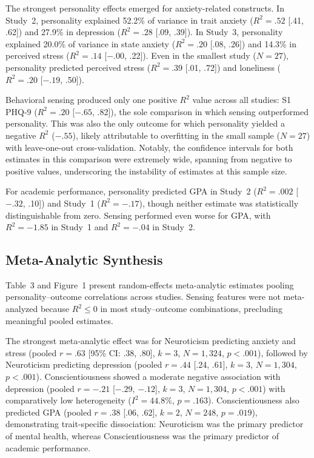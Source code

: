 \documentclass[12pt, a4paper]{article}
\begin{document}
The strongest personality effects emerged for anxiety-related constructs. In Study~2, personality explained 52.2\% of variance in trait anxiety ($R^2 = .52$ [.41, .62]) and 27.9\% in depression ($R^2 = .28$ [.09, .39]). In Study~3, personality explained 20.0\% of variance in state anxiety ($R^2 = .20$ [.08, .26]) and 14.3\% in perceived stress ($R^2 = .14$ [${-.00}$, .22]). Even in the smallest study ($N = 27$), personality predicted perceived stress ($R^2 = .39$ [.01, .72]) and loneliness ($R^2 = .20$ [${-.19}$, .50]).

Behavioral sensing produced only one positive $R^2$ value across all studies: S1 PHQ-9 ($R^2 = .20$ [${-.65}$, .82]), the sole comparison in which sensing outperformed personality. This was also the only outcome for which personality yielded a negative $R^2$ ($-.55$), likely attributable to overfitting in the small sample ($N = 27$) with leave-one-out cross-validation. Notably, the confidence intervals for both estimates in this comparison were extremely wide, spanning from negative to positive values, underscoring the instability of estimates at this sample size.

For academic performance, personality predicted GPA in Study~2 ($R^2 = .002$ [${-.32}$, .10]) and Study~1 ($R^2 = -.17$), though neither estimate was statistically distinguishable from zero. Sensing performed even worse for GPA, with $R^2 = -1.85$ in Study~1 and $R^2 = -.04$ in Study~2.

\subsection{Meta-Analytic Synthesis}

Table~3 and Figure~1 present random-effects meta-analytic estimates pooling personality--outcome correlations across studies. Sensing features were not meta-analyzed because $R^2 \leq 0$ in most study--outcome combinations, precluding meaningful pooled estimates.

The strongest meta-analytic effect was for Neuroticism predicting anxiety and stress (pooled $r = .63$ [95\% CI: .38, .80], $k = 3$, $N = 1{,}324$, $p < .001$), followed by Neuroticism predicting depression (pooled $r = .44$ [.24, .61], $k = 3$, $N = 1{,}304$, $p < .001$). Conscientiousness showed a moderate negative association with depression (pooled $r = -.21$ [${-.29}$, ${-.12}$], $k = 3$, $N = 1{,}304$, $p < .001$) with comparatively low heterogeneity ($I^2 = 44.8\%$, $p = .163$). Conscientiousness also predicted GPA (pooled $r = .38$ [.06, .62], $k = 2$, $N = 248$, $p = .019$), demonstrating trait-specific dissociation: Neuroticism was the primary predictor of mental health, whereas Conscientiousness was the primary predictor of academic performance.
\end{document}
